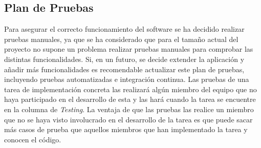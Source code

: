 \subsection{Plan de Pruebas}\label{sec:qapruebas}
Para asegurar el correcto funcionamiento del software se ha decidido realizar pruebas manuales, ya que se ha considerado que para el tamaño actual del proyecto no supone un problema realizar pruebas manuales para comprobar las distintas funcionalidades. Si, en un futuro, se decide extender la aplicación y añadir más funcionalidades es recomendable actualizar este plan de pruebas, incluyendo pruebas automatizadas e integración continua. Las pruebas de una tarea de implementación concreta las realizará algún miembro del equipo que no haya participado en el desarrollo de esta y las hará cuando la tarea se encuentre en la columna de \textit{Testing}. La ventaja de que las pruebas las realice un miembro que no se haya visto involucrado en el desarrollo de la tarea es que puede sacar más casos de prueba que aquellos miembros que han implementado la tarea y conocen el código.

